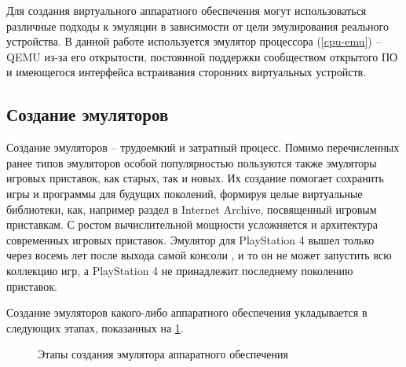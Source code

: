 Для создания виртуального аппаратного обеспечения могут использоваться различные подходы к эмуляции в зависимости
от цели эмулирования реального устройства.
В данной работе используется эмулятор процессора (\cref{cpu-emu}) -- QEMU \cite{qemu} из-за его открытости,
постоянной поддержки сообществом открытого ПО и имеющегося интерфейса встраивания
сторонних виртуальных устройств.


\subsection{Создание эмуляторов}\label{sec:ch1/sec1/sub2}

Создание эмуляторов -- трудоемкий и затратный процесс. Помимо перечисленных ранее типов эмуляторов особой популярностью
пользуются также эмуляторы игровых приставок, как старых, так и новых.
Их создание помогает сохранить игры и программы для будущих поколений, формируя целые виртуальные библиотеки, как,
например раздел в Internet Archive\cite{console-archive}, посвященный игровым приставкам.
С ростом вычислительной мощности усложняется и архитектура современных игровых приставок.
Эмулятор для PlayStation 4 вышел только через восемь лет после выхода самой консоли \cite{ps4-emulator}, и то
он не может запустить всю коллекцию игр, а PlayStation 4 не принадлежит последнему поколению приставок.

Создание эмуляторов какого-либо аппаратного обеспечения укладывается в следующих этапах,
показанных на \cref{fig:emu-creation-naive}.

\begin{figure}[!htbp]
    \centering
    \caption{Этапы создания эмулятора аппаратного обеспечения}\label{fig:emu-creation-naive}
\end{figure}

